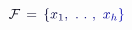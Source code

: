 \documentclass[12pt]{article}
\begin{document}
\makeatletter
\renewcommand*{\@textcolor}[3]{%
  \protect\leavevmode
  \begingroup
    \color#1{#2}#3%
  \endgroup
}
\makeatother
\begin{displaymath}
\mathcal { \mathcolor[RGB]{0,0,15}{F} } \, \mathcolor[RGB]{0,0,30}{=} \, \mathcolor[RGB]{0,0,45}{\{} \mathcolor[RGB]{0,0,60}{x} _ { \mathcolor[RGB]{0,0,75}{1} } \mathcolor[RGB]{0,0,90}{,} ~ \mathcolor[RGB]{0,0,105}{.} ~ \mathcolor[RGB]{0,0,120}{.} ~ \mathcolor[RGB]{0,0,135}{,} ~ \mathcolor[RGB]{0,0,150}{x} _ { \mathcolor[RGB]{0,0,165}{h} } \mathcolor[RGB]{0,0,180}{\}}
\end{displaymath}
\end{document}
